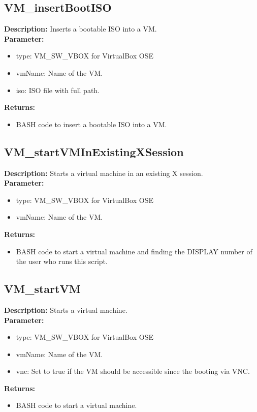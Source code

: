 \subsection{VM\_insertBootISO}
\textbf{Description:} Inserts a bootable ISO into a VM.\\
\textbf{Parameter:}
\begin{itemize}
\item type: VM\_SW\_VBOX for VirtualBox OSE
\item vmName: Name of the VM.
\item iso: ISO file with full path.
\end{itemize}
\textbf{Returns:}
\begin{itemize}
\item BASH code to insert a bootable ISO into a VM.
\end{itemize}

\subsection{VM\_startVMInExistingXSession}
\textbf{Description:} Starts a virtual machine in an existing X session.\\
\textbf{Parameter:}
\begin{itemize}
\item type: VM\_SW\_VBOX for VirtualBox OSE
\item vmName: Name of the VM.
\end{itemize}
\textbf{Returns:}
\begin{itemize}
\item BASH code to start a virtual machine and finding the DISPLAY number of the user who runs this script.
\end{itemize}

\subsection{VM\_startVM}
\textbf{Description:} Starts a virtual machine.\\
\textbf{Parameter:}
\begin{itemize}
\item type: VM\_SW\_VBOX for VirtualBox OSE
\item vmName: Name of the VM.
\item vnc: Set to true if the VM should be accessible since the booting via VNC.
\end{itemize}
\textbf{Returns:}
\begin{itemize}
\item BASH code to start a virtual machine.
\end{itemize}

